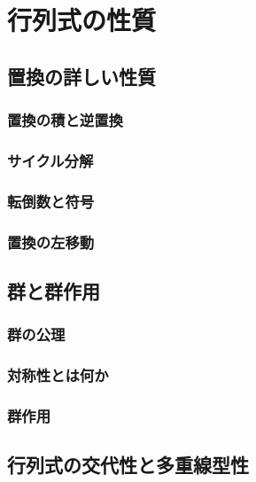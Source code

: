 \chapter{行列式の性質}

\section{置換の詳しい性質}

\subsection{置換の積と逆置換}

\subsection{サイクル分解}

\subsection{転倒数と符号}

\subsection{置換の左移動}

\section{群と群作用}

\subsection{群の公理}


\subsection{対称性とは何か}

\subsection{群作用}



\section{行列式の交代性と多重線型性}


